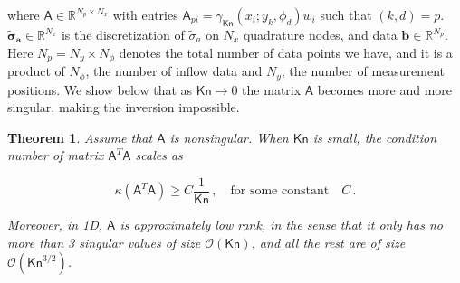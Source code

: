 \documentclass[english,reqno]{amsart}
\theoremstyle{plain}
\newtheorem{theorem}{Theorem}
\theoremstyle{definition} %
\renewcommand{\vec}[1]{\mathbf{#1}}
\newcommand{\Amat}{\mathsf{A}}
\newcommand{\Kn}{\mathsf{Kn}}
\begin{document}
where $\Amat \in \mathbb{R}^{N_p \times N_x}$ with entries $\Amat_{pi}=\gamma_\Kn(x_i; y_k, \phi_d)w_i$ such that $(k,d) = p$. $\vec{\tilde{\sigma}_a}\in \mathbb{R}^{N_x}$ is the discretization of $\tilde{\sigma}_a$ on $N_x$ quadrature nodes, and data $\vec{b}\in\mathbb{R}^{N_p}$. Here $N_p=N_y\times N_{\phi}$ denotes the total number of data points we have, and it is a product of $N_{\phi}$, the number of inflow data and $N_y$, the number of measurement positions. We show below that as $\Kn\to 0$ the matrix $\Amat$ becomes more and more singular, making the inversion impossible.
\begin{theorem} \label{theorem:abs}
Assume that $\Amat$ is nonsingular. When $\Kn$ is small,  the condition number of matrix $\Amat^T\Amat$ scales as

\begin{equation}
\kappa(\Amat^T \Amat) \geq C\frac{1}{\Kn} \,, \quad \text{for some constant} \quad C\,.
\end{equation}

Moreover, in 1D, $\Amat$ is approximately low rank, in the sense that it only has no more than 3 singular values of size $\mathcal{O}(\Kn)$, and all the rest are of size $\mathcal{O}(\Kn^{3/2})$.
 \end{theorem}
\end{document}
